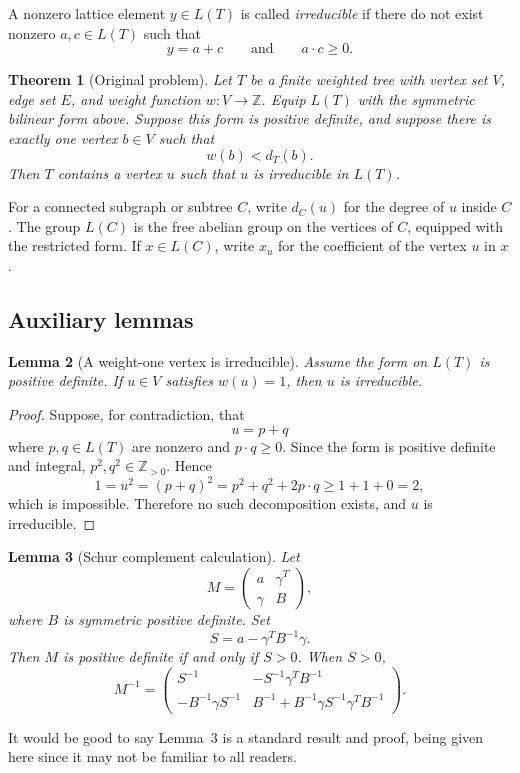 \documentclass[12pt]{article}
\newcommand{\Z}{\mathbb{Z}}
\newtheorem{theorem}{Theorem}
\newtheorem{lemma}[theorem]{Lemma}
\newcommand{\review}[1]{\begin{reviewbox}#1\end{reviewbox}}
\begin{document}
A nonzero lattice element \(y\in L(T)\) is called \emph{irreducible} if there do not exist nonzero \(a,c\in L(T)\) such that
\[
y=a+c
\qquad\text{and}\qquad
a\cdot c\ge 0.
\]

\begin{theorem}[Original problem]\label{thm:main}
Let \(T\) be a finite weighted tree with vertex set \(V\), edge set \(E\), and weight function \(w:V\to\Z\). Equip \(L(T)\) with the symmetric bilinear form above. Suppose this form is positive definite, and suppose there is exactly one vertex \(b\in V\) such that
\[
w(b)<d_T(b).
\]
Then \(T\) contains a vertex \(u\) such that \(u\) is irreducible in \(L(T)\).
\end{theorem}

For a connected subgraph or subtree \(C\), write \(d_C(u)\) for the degree of \(u\) inside \(C\). The group \(L(C)\) is the free abelian group on the vertices of \(C\), equipped with the restricted form. If \(x\in L(C)\), write \(x_u\) for the coefficient of the vertex \(u\) in \(x\).

\subsection*{Auxiliary lemmas}

\begin{lemma}[A weight-one vertex is irreducible]\label{lem:weight-one}
Assume the form on \(L(T)\) is positive definite. If \(u\in V\) satisfies \(w(u)=1\), then \(u\) is irreducible.
\end{lemma}

\begin{proof}
Suppose, for contradiction, that
\[
u=p+q
\]
where \(p,q\in L(T)\) are nonzero and \(p\cdot q\ge 0\). Since the form is positive definite and integral, \(p^2,q^2\in\Z_{>0}\). Hence
\[
1=u^2=(p+q)^2=p^2+q^2+2p\cdot q
\ge 1+1+0=2,
\]
which is impossible. Therefore no such decomposition exists, and \(u\) is irreducible.
\end{proof}

\begin{lemma}[Schur complement calculation]\label{lem:schur}
Let
\[
M=
\begin{pmatrix}
a & \gamma^T\\
\gamma & B
\end{pmatrix},
\]
where \(B\) is symmetric positive definite. Set
\[
S=a-\gamma^T B^{-1}\gamma.
\]
Then \(M\) is positive definite if and only if \(S>0\). When \(S>0\),
\[
M^{-1}=
\begin{pmatrix}
S^{-1} & -S^{-1}\gamma^T B^{-1}\\
-B^{-1}\gamma S^{-1} &
B^{-1}+B^{-1}\gamma S^{-1}\gamma^T B^{-1}
\end{pmatrix}.
\]
\end{lemma}
\review{It would be good to say Lemma~3 is a standard result and proof, being given here since it may not be familiar to all readers.}
\end{document}
